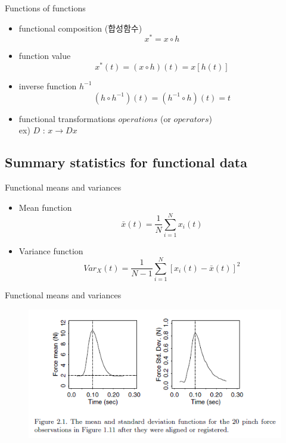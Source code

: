 \documentclass{beamer}
\begin{document}
\begin{frame}{Functions of functions}
	\begin{itemize}
		\item {
			functional composition (합성함수) \\
			$$ x^*=x \circ h $$	
		}
		\item {
			function value \\
			$$ x^*(t)=(x \circ h)(t)=x[h(t)] $$
		}
		\item {
			inverse function $h^{-1}$\\
			$$ (h \circ h^{-1})(t)=(h^{-1} \circ h)(t)=t $$
		}	
		\item {
			functional transformations $operations$ (or $operators$) \\
			ex) $D$ : $x \rightarrow Dx$
		}	
	\end{itemize}
\end{frame}


\subsection{Summary statistics for functional data}

\begin{frame}{Functional means and variances}
  \begin{itemize}
	\item {
		Mean function
		$$ \bar{x}(t)=\frac{1}{N}\sum_{i=1}^{N}x_i(t) $$
	}
	\item {
		Variance function
		$$ Var_X(t)=\frac{1}{N-1}\sum_{i=1}^{N}[x_i(t)-\bar{x}(t)]^2 $$
	}
  \end{itemize}
\end{frame}

\begin{frame}{Functional means and variances}
\begin{figure}[h] %
	\begin{center}
		\includegraphics[width=1\linewidth]{img/1.png}
	\end{center}
	\label{fig:long}
	\label{fig:onecol}
\end{figure}	
\end{frame}
\end{document}
